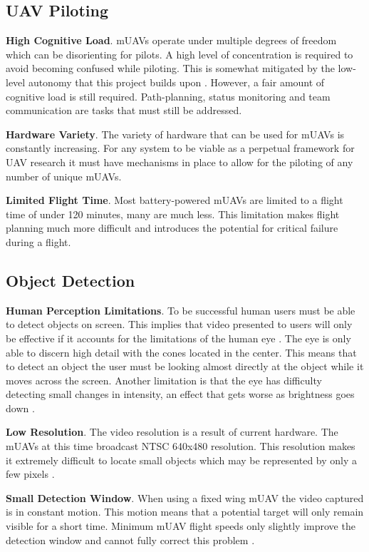 \subsection{UAV Piloting}

\textbf{High Cognitive Load}.  mUAVs operate under multiple
degrees of freedom which can be disorienting for pilots.  A high level of
concentration is required to avoid becoming confused while piloting.  This is
somewhat mitigated by the low-level autonomy that this project builds upon
\cite{lin2010supporting}.  However, a fair amount of cognitive load is still
required.  Path-planning, status monitoring and team communication are tasks
that must still be addressed.

\textbf{Hardware Variety}.  The variety of hardware that can be used for mUAVs
is constantly increasing.  For any system to be viable as a perpetual framework
for UAV research it must have mechanisms in place to allow for the piloting of any number of unique mUAVs.

\textbf{Limited Flight Time}.  Most battery-powered mUAVs are limited to a
flight time of under 120 minutes, many are much less.  This limitation makes flight
planning much more difficult and introduces the potential for critical failure
during a flight.

\subsection{Object Detection}

\textbf{Human Perception Limitations}.  To be successful human
users must be able to detect objects on screen.  This implies that video presented to users
will only be effective if it accounts for the limitations of the human
eye \cite{humphrey2009human}. The eye is only able to discern high detail with
the cones located in the center.
This means that to detect an object the user must be looking almost directly at
the object while it moves across the screen.  Another limitation is that 
the eye has difficulty detecting small changes in intensity, an effect that gets
worse as brightness goes down \cite{gonzalezwoodsDIP}.

\textbf{Low Resolution}.  The video resolution is a result of
current hardware.  The mUAVs at this time broadcast NTSC 640x480 resolution. 
This resolution makes it extremely difficult to locate small objects which may be represented by only
a few pixels \cite{goodrich2009towards}.

\textbf{Small Detection Window}.  When using a fixed wing mUAV the video
captured is in constant motion.  This motion means that a potential target will
only remain visible for a short time.  Minimum mUAV flight speeds only slightly
improve the detection window and cannot fully correct this
problem \cite{goodrich2009towards}.

